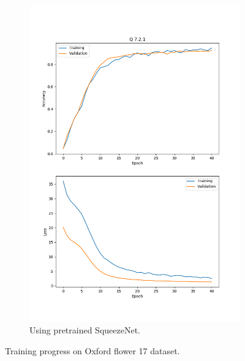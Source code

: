\documentclass[11pt]{article}
\begin{document}
\begin{figure}[h!]
\begin{subfigure}{.495\textwidth}
    \end{subfigure}
    \begin{subfigure}{.495\textwidth}
      \centering
      \includegraphics[width=.9\linewidth]{../results/q7_2_1_17_squeeze.png}
      \caption{Using pretrained SqueezeNet. }
    \end{subfigure}\hfill
    \caption{Training progress on Oxford flower 17 dataset. }
    \label{fig:q7.2.1}
\end{figure}
\end{document}
